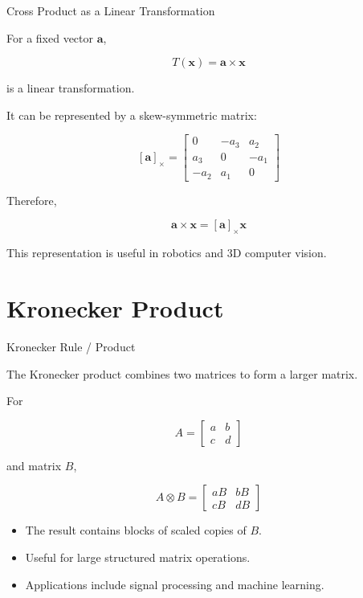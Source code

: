\documentclass[aspectratio=169]{beamer}
\begin{document}
\begin{frame}{Cross Product as a Linear Transformation}
\footnotesize

For a fixed vector $\mathbf{a}$,

$$
T(\mathbf{x})=\mathbf{a}\times\mathbf{x}
$$

is a linear transformation.

It can be represented by a skew-symmetric matrix:

$$
[\mathbf{a}]_\times=
\begin{bmatrix}
0&-a_3&a_2\\
a_3&0&-a_1\\
-a_2&a_1&0
\end{bmatrix}
$$

Therefore,

$$
\mathbf{a}\times\mathbf{x}
=
[\mathbf{a}]_\times\mathbf{x}
$$

This representation is useful in robotics and 3D computer vision.

\end{frame}

\section{Kronecker Product}

\begin{frame}{Kronecker Rule / Product}
\small

The Kronecker product combines two matrices to form a larger matrix.

For

$$
A=
\begin{bmatrix}
a&b\\
c&d
\end{bmatrix}
$$

and matrix $B$,

$$
A\otimes B
=
\begin{bmatrix}
aB&bB\\
cB&dB
\end{bmatrix}
$$

\begin{itemize}
\item The result contains blocks of scaled copies of $B$.
\item Useful for large structured matrix operations.
\item Applications include signal processing and machine learning.
\end{itemize}

\end{frame}
\end{document}
